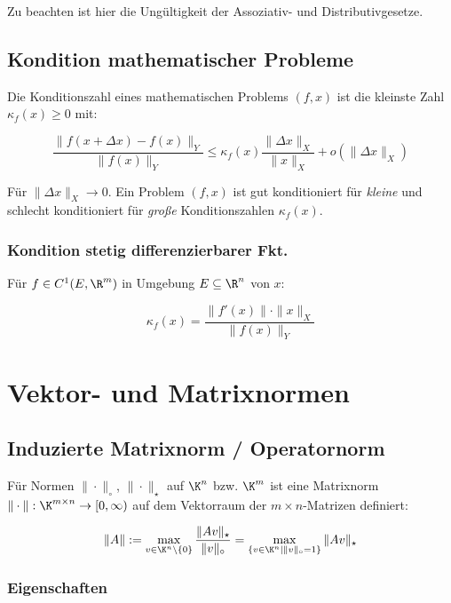 Zu beachten ist hier die Ungültigkeit der Assoziativ- und Distributivgesetze.

\subsection*{Kondition mathematischer Probleme}

Die Konditionszahl eines mathematischen Problems $(f, x)$ ist die kleinste Zahl $\kappa_f(x) \geq 0$ mit:

\vspace*{-4mm}
$$\frac{\|f(x + \Delta x) - f(x) \|_Y}{\|f(x)\|_Y} \leq \kappa_f(x) \frac{\|\Delta x\|_X}{\|x\|_X} + o(\|\Delta x \|_X)$$

Für $\|\Delta x\|_X \rightarrow 0$. Ein Problem $(f, x)$ ist gut konditioniert für \emph{kleine} und schlecht konditioniert für \emph{große} Konditionszahlen $\kappa_f(x)$.

\subsubsection*{Kondition stetig differenzierbarer Fkt.}

Für $f \in C^1(E, \R^m)$ in Umgebung $E \subseteq \R^n$ von $x$:

\vspace*{-2mm}
$$\kappa_f(x) = \frac{\|f'(x)\| \cdot \|x\|_X}{\|f(x)\|_Y}$$

\section*{Vektor- und Matrixnormen}

\subsection*{Induzierte Matrixnorm / Operatornorm}

Für Normen $\| \cdot \|_\circ$, $\| \cdot \|_\star$ auf $\K^n$ bzw. $\K^m$ ist eine Matrixnorm $\| \cdot \| : \K^{m \times n} \rightarrow [0,\infty)$ auf dem Vektorraum der $m \times n$-Matrizen definiert:

\vspace*{-4mm}
$$\|A\| := \max_{v \in \K^n \setminus \{0\}} \frac{\|Av\|_\star}{\|v\|_\circ} = \max_{\{v \in \K^n | \|v\|_\circ = 1 \}} \|Av\|_\star$$

\subsubsection*{Eigenschaften}

